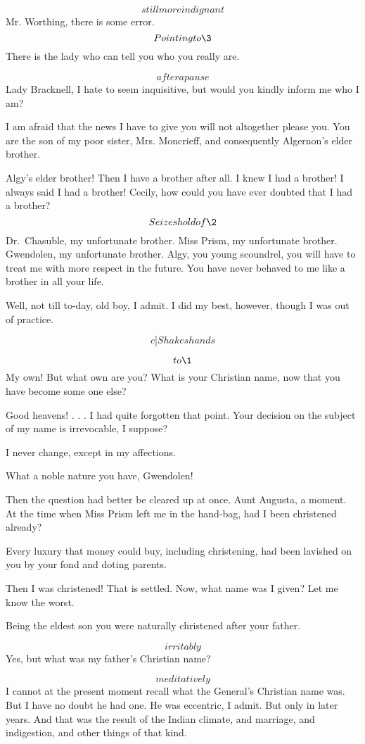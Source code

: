 \documentclass{book}
\begin{document}
\6  \[still more indignant\]  Mr. Worthing, there is some
error.  \[Pointing to \3\]  There is the lady who can
tell you who you really are.

\1  \[after a pause\]  Lady Bracknell, I hate to seem
inquisitive, but would you kindly inform me who I am?

\3  I am afraid that the news I have to give you will
not altogether please you.  You are the son of my poor sister, Mrs.
Moncrieff, and consequently Algernon's elder brother.

\1  Algy's elder brother!  Then I have a brother after all.  I
knew I had a brother!  I always said I had a brother!  Cecily,
\textemdash
how could you have ever doubted that I had a brother?  \[Seizes hold
of \2\]  Dr.~Chasuble, my unfortunate brother.  Miss Prism,
my unfortunate brother.  Gwendolen, my unfortunate brother.  Algy,
you young scoundrel, you will have to treat me with more respect in
the future.  You have never behaved to me like a brother in all
your life.

\2  Well, not till to-day, old boy, I admit.  I did my best,
however, though I was out of practice.

\[c]Shakes hands\]

\4  \[to \1\]  My own!  But what own are you?  What is
your Christian name, now that you have become some one else?

\1  Good heavens! . . . I had quite forgotten that point.  Your
decision on the subject of my name is irrevocable, I suppose?

\4  I never change, except in my affections.

\5  What a noble nature you have, Gwendolen!

\1  Then the question had better be cleared up at once.  Aunt
Augusta, a moment.  At the time when Miss Prism left me in the
hand-bag, had I been christened already?

\3 { 
 Every luxury that money could buy, including \break
christening, had been lavished on you by your fond and doting
parents.}

\1  Then I was christened!  That is settled.  Now, what name was
I given?  Let me know the worst.

\3  Being the eldest son you were naturally christened
after your father.

\1  \[irritably\]  Yes, but what was my father's Christian name?

\3  \[meditatively\]  I cannot at the present moment
recall what the General's Christian name was.  But I have no doubt
he had one.  He was eccentric, I admit.  But only in later years.
And that was the result of the Indian climate, and marriage, and
indigestion, and other things of that kind.
\end{document}
